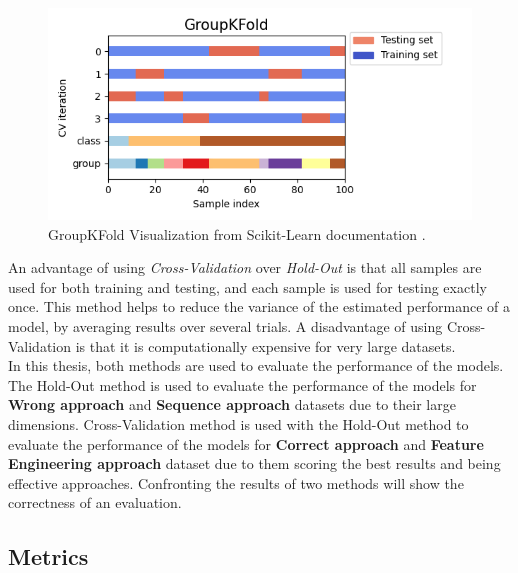 \begin{itemize}
                    \begin{figure}[H]
                        \centering
                        \includegraphics[width=1.0\textwidth]{../src/resources/images/other/groupkfold.png}
                        \caption{
                          GroupKFold Visualization from Scikit-Learn documentation \cite{scikit-learn}.
                        }
                        \label{fig:groupkfold}
                    \end{figure}
                \end{itemize}
                
        An advantage of using \textit{Cross-Validation} over \textit{Hold-Out} is that all samples are used for both training and testing, and each sample is used for testing exactly once. This method helps to reduce the variance of the estimated performance of a model, by averaging results over several trials. A disadvantage of using Cross-Validation is that it is computationally expensive for very large datasets. \\ 

        In this thesis, both methods are used to evaluate the performance of the models. The Hold-Out method is used to evaluate the performance of the models for \textbf{Wrong approach} and \textbf{Sequence approach} datasets due to their large dimensions. Cross-Validation method is used with the Hold-Out method to evaluate the performance of the models for \textbf{Correct approach} and \textbf{Feature Engineering approach} dataset due to them scoring the best results and being effective approaches. Confronting the results of two methods will show the correctness of an evaluation. 
        
        \subsection{Metrics}

